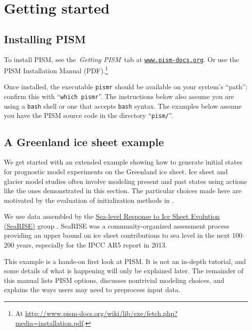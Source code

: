 
\section{Getting started}\label{sec:start}

\subsection{Installing PISM}

To install PISM, see the \,\emph{Getting PISM}\, tab at \href{http://www.pism-docs.org}{\texttt{www.pism-docs.org}}.  Or use the PISM Installation Manual (PDF).\footnote{At \url{http://www.pism-docs.org/wiki/lib/exe/fetch.php?media=installation.pdf}.}

Once installed, the executable \texttt{pismr} should be available on your system's ``path''; confirm this with ``\texttt{which pismr}''.  The instructions below also assume you are using a \texttt{bash} shell or one that accepts \texttt{bash} syntax.  The examples below assume you have the PISM source code in the directory ``\texttt{pism/}''.

\subsection{A Greenland ice sheet example}

We get started with an extended example showing how to generate initial states for prognostic model experiments on the Greenland ice sheet.  Ice sheet and glacier model studies often involve modeling present and past states using actions like the ones demonstrated in this section.  The particular choices made here are motivated by the evaluation of initialization methods in \cite{AschwandenAdalgeirsdottirKhroulev}.

We use data assembled by the \href{http://websrv.cs.umt.edu/isis/index.php/SeaRISE_Assessment}{Sea-level Response to Ice Sheet Evolution (SeaRISE)} group \cite{Bindschadler2013SeaRISE}.  SeaRISE was a community-organized assessment process providing an upper bound on ice sheet contributions to sea level in the next 100--200 years, especially for the IPCC AR5 report in 2013.

This example is a hands-on first look at PISM.  It is not an in-depth tutorial, and some details of what is happening will only be explained later.  The remainder of this manual lists PISM options, discusses nontrivial modeling choices, and explains the ways users may need to preprocess input data.

